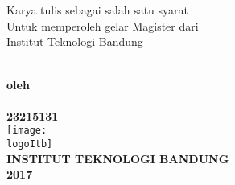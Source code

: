 %

%
%

\begin{titlepage}
	\begin{center}
		{\large\bfseries  %
			\expandafter \uppercase \expandafter{\Judul}%
			\\}
		\vspace{2cm}
		\expandafter\uppercase\expandafter{\Type}\\[1.5cm]
		Karya tulis sebagai salah satu syarat\\
		Untuk memperoleh gelar Magister dari\\
		Institut Teknologi Bandung\\[1.5cm]
		\textsc{\Large{{ }}} \\[5pt]
		{ } \vspace{0.4cm} 
		\vfill
		
		\vspace{6ex}
		{\small\bfseries{oleh}\\}
		{\normalsize\bfseries
			\expandafter\uppercase\expandafter{\Penulis}%
			\\
			23215131\\
		}
		\vspace{10ex}
		\texttt{[image: \\logoItb]}\\[5pt]
		\vspace{2cm}
		{\bfseries \large \uppercase
			{Institut Teknologi Bandung}\\[5pt]
			{2017}
		}
		\vfill
		
	\end{center}
\end{titlepage}


